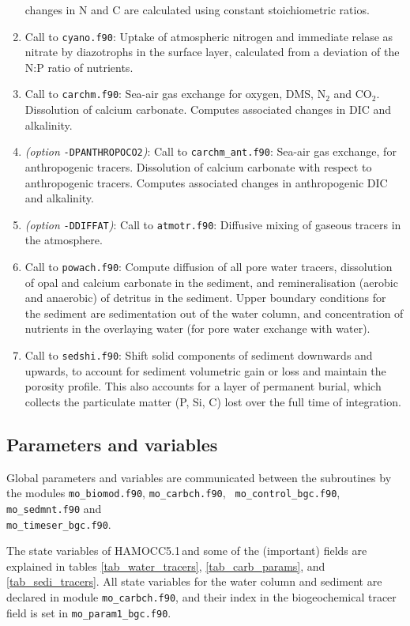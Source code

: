 \documentclass[11pt,a4paper,fleqn,twoside]{article}
\newcommand{\ham}{HAMOCC5.1\,}
\begin{document}
\begin{enumerate}
changes in N and C are calculated using constant stoichiometric
ratios.
\item Call to {\tt cyano.f90}: Uptake of atmospheric nitrogen and immediate
relase as nitrate by diazotrophs in the surface layer, calculated from a
deviation of the N:P ratio of nutrients.
\item Call to {\tt carchm.f90}: Sea-air gas exchange for oxygen, DMS, N$_2$
and CO$_2$. Dissolution of calcium carbonate. Computes associated changes in
DIC and alkalinity.
\item {\em (option }{\tt -DPANTHROPOCO2}{\em)}: Call to {\tt carchm\_ant.f90}: Sea-air
gas exchange, for anthropogenic tracers. Dissolution of calcium carbonate with
respect to anthropogenic tracers. Computes associated changes in anthropogenic
DIC and alkalinity.
\item {\em (option }{\tt -DDIFFAT}{\em)}: Call to {\tt atmotr.f90}: Diffusive mixing of
gaseous tracers in the atmosphere.
\item Call to {\tt powach.f90}: Compute diffusion of all pore water tracers, 
dissolution of opal and calcium carbonate in the sediment, and remineralisation
(aerobic and anaerobic) of detritus in the sediment. Upper boundary conditions
for the sediment are sedimentation out of the water column, and concentration
of nutrients in the overlaying water (for pore water exchange with water). 
\item Call to {\tt sedshi.f90}: Shift solid components of sediment downwards
and upwards, to account for sediment volumetric gain or loss and maintain the
porosity profile. This also accounts  for a layer of permanent burial, which
collects the particulate matter (P, Si, C) lost over the full time of
integration.
\end{enumerate}

\subsection{\label{parameters_and_variables}Parameters and variables}

Global parameters and variables are communicated between the subroutines by
the modules {\tt mo\_biomod.f90}, {\tt mo\_carbch.f90}, {\tt
mo\_control\_bgc.f90}, {\tt mo\_sedmnt.f90} and \\
{\tt mo\_timeser\_bgc.f90}. 

The state variables of \ham and some of the (important)
fields are explained in tables \ref{tab_water_tracers}, \ref{tab_carb_params},
and \ref{tab_sedi_tracers}. All state variables for the water column and
sediment are declared in module {\tt mo\_carbch.f90}, and their
index in the biogeochemical tracer field is set in {\tt mo\_param1\_bgc.f90}.
\end{document}
